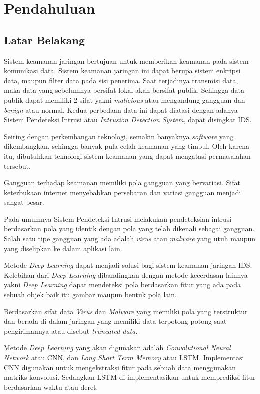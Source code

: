 \documentclass[./skripsi.tex]{subfiles}
\begin{document}
\chapter{Pendahuluan}
\section{Latar Belakang}
\par Sistem keamanan jaringan bertujuan untuk memberikan keamanan pada sistem komunikasi data. Sistem keamanan jaringan ini dapat berupa sistem enkripsi data, maupun filter data pada sisi penerima. Saat terjadinya transmisi data, maka data yang sebelumnya bersifat lokal akan bersifat publik. Sehingga data publik dapat memiliki 2 sifat yakni  \textit{malicious} atau mengandung gangguan dan \textit{benign} atau normal. Kedua perbedaan data ini dapat diatasi dengan adanya Sistem Pendeteksi Intrusi atau \textit{Intrusion Detection System}, dapat disingkat IDS.
\par
Seiring dengan perkembangan teknologi, semakin banyaknya \textit{software} yang dikembangkan, sehingga banyak pula celah keamanan yang timbul. Oleh karena itu, dibutuhkan teknologi sistem keamanan yang dapat mengatasi permasalahan tersebut.
\par Gangguan terhadap keamanan memiliki pola gangguan yang bervariasi. Sifat keterbukaan internet menyebabkan persebaran dan variasi gangguan menjadi sangat besar.
\par Pada umumnya Sistem Pendeteksi Intrusi melakukan pendeteksian intrusi berdasarkan pola yang identik dengan pola yang telah dikenali sebagai gangguan. Salah satu tipe gangguan yang ada adalah \textit{virus} atau \textit{malware} yang utuh maupun yang diselipkan ke dalam aplikasi lain.
\par Metode \textit{Deep Learning} dapat menjadi solusi bagi sistem keamanan jaringan IDS. Kelebihan dari \textit{Deep Learning} dibandingkan dengan metode kecerdasan lainnya yakni \textit{Deep Learning} dapat mendeteksi pola berdasarkan fitur yang ada pada sebuah objek baik itu gambar maupun bentuk pola lain.
\par Berdasarkan sifat data \textit{Virus} dan \textit{Malware} yang memiliki pola yang terstruktur dan berada di dalam jaringan yang memiliki data terpotong-potong saat pengirimannya atau disebut \textit{truncated data}.
\par Metode \textit{Deep Learning} yang akan digunakan adalah \textit{Convolutional Neural Network} atau CNN, dan \textit{Long Short Term Memory} atau LSTM. Implementasi CNN digunakan untuk mengekstraksi fitur pada sebuah data menggunakan matriks konvolusi. Sedangkan LSTM di implementasikan untuk memprediksi fitur berdasarkan waktu atau deret.
\end{document}
